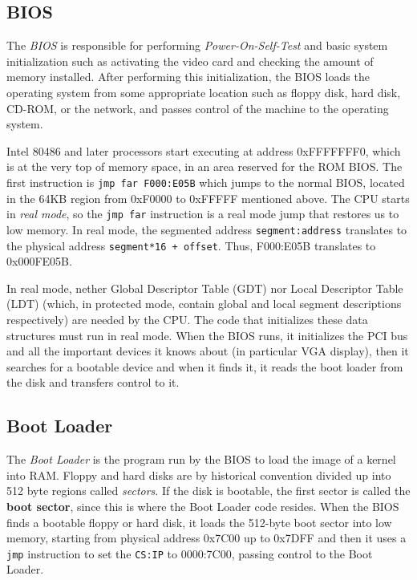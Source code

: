 \subsection{BIOS}
The \emph{BIOS} is responsible for performing \emph{Power-On-Self-Test} and basic system initialization such as activating the video card and checking the amount of memory installed. After performing this initialization, the BIOS loads the operating system from some appropriate location such as floppy disk, hard disk, CD-ROM, or the network, and passes control of the machine to the operating system.

Intel 80486 and later processors start executing at address 0xFFFFFFF0, which is at the very top of memory space, in an area reserved for the ROM BIOS. The first instruction is \texttt{jmp far F000:E05B} which jumps to the normal BIOS, located in the 64KB region from 0xF0000 to 0xFFFFF mentioned above. The CPU starts in \emph{real mode}, so the \texttt{jmp far} instruction is a real mode jump that restores us to low memory. In real mode, the segmented address \texttt{segment:address} translates to the physical address \texttt{segment*16 + offset}. Thus, F000:E05B translates to 0x000FE05B.

In real mode, nether Global Descriptor Table (GDT) nor Local Descriptor Table (LDT) (which, in protected mode, contain global and local segment descriptions respectively) are needed by the CPU. The code that initializes these data structures must run in real mode. When the BIOS runs, it initializes the PCI bus and all the important devices it knows about (in particular VGA display), then it searches for a bootable device and when it finds it, it reads the boot loader from the disk and transfers control to it.

\subsection{Boot Loader}
The \emph{Boot Loader} is the program run by the BIOS to load the image of a kernel into RAM. Floppy and hard disks are by historical convention divided up into 512 byte regions called \emph{sectors}. If the disk is bootable, the first sector is called the \textbf{boot sector}, since this is where the Boot Loader code resides. When the BIOS finds a bootable floppy or hard disk, it loads the 512-byte boot sector into low memory, starting from physical address 0x7C00 up to 0x7DFF and then it uses a \texttt{jmp} instruction to set the \texttt{CS:IP} to 0000:7C00, passing control to the Boot Loader.

